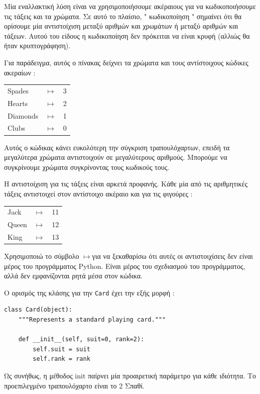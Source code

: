 \documentclass[10pt]{book}
\begin{document}
Μία εναλλακτική λύση είναι να χρησιμοποιήσουμε ακέραιους για να κωδικοποιήσουμε τις 
τάξεις και τα χρώματα.  Σε αυτό το πλαίσιο,  " κωδικοποίηση "  σημαίνει 
ότι θα ορίσουμε μία αντιστοίχιση μεταξύ αριθμών και χρωμάτων ή μεταξύ αριθμών και τάξεων. 
Αυτού του είδους η κωδικοποίηση δεν πρόκειται να είναι κρυφή (αλλιώς θα ήταν κρυπτογράφηση). 

\newcommand{\mymapsto}{$\mapsto$}

 Για παράδειγμα, αυτός ο πίνακας δείχνει τα χρώματα και τους αντίστοιχους κώδικες 
ακεραίων :

\begin{tabular}{l c l}
Spades & \mymapsto & 3 \\
Hearts & \mymapsto & 2 \\
Diamonds & \mymapsto & 1 \\
Clubs & \mymapsto & 0
\end{tabular}

 Αυτός ο κώδικας κάνει ευκολότερη την σύγκριση τραπουλόχαρτων, επειδή τα μεγαλύτερα 
χρώματα αντιστοιχούν σε μεγαλύτερους αριθμούς.  Μπορούμε να συγκρίνουμε χρώματα συγκρίνοντας τους κωδικούς τους.

Η αντιστοίχιση για τις τάξεις είναι αρκετά προφανής. Κάθε μία από τις αριθμητικές τάξεις 
αντιστοιχεί στον αντίστοιχο ακέραιο και για τις φιγούρες :

\begin{tabular}{l c l}
Jack & \mymapsto & 11 \\
Queen & \mymapsto & 12 \\
King & \mymapsto & 13 \\
\end{tabular}

 Χρησιμοποιώ το σύμβολο  \mymapsto  για να ξεκαθαρίσω ότι αυτές οι  αντιστοιχίσεις δεν είναι μέρος του προγράμματος  Python.   Είναι μέρος του σχεδιασμού του προγράμματος, αλλά δεν εμφανίζονται ρητά μέσα στον κώδικα.

Ο ορισμός της κλάσης για την  {\tt Card}  έχει την εξής μορφή :

\begin{verbatim}
class Card(object):
    """Represents a standard playing card."""

    def __init__(self, suit=0, rank=2):
        self.suit = suit
        self.rank = rank
\end{verbatim}
%
 Ως συνήθως, η μέθοδος  init  παίρνει μία προαιρετική παράμετρο για κάθε 
ιδιότητα.  Το προεπιλεγμένο τραπουλόχαρτο είναι το 2 Σπαθί.
\end{document}
